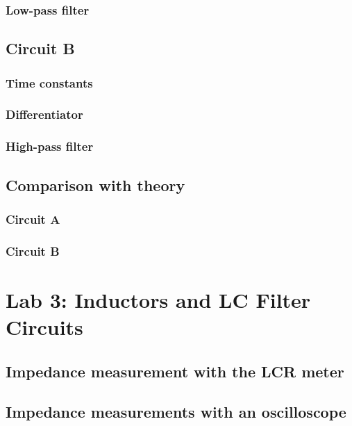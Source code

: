 \documentclass{article}
\begin{document}
\subsubsection{Low-pass filter}

\subsection{Circuit B}

\subsubsection{Time constants}

\subsubsection{Differentiator}

\subsubsection{High-pass filter}


\subsection{Comparison with theory}

\subsubsection{Circuit A}

\subsubsection{Circuit B}





\section{Lab 3: Inductors and LC Filter Circuits}

\subsection{Impedance measurement with the LCR meter}

\subsection{Impedance measurements with an oscilloscope}
\end{document}

